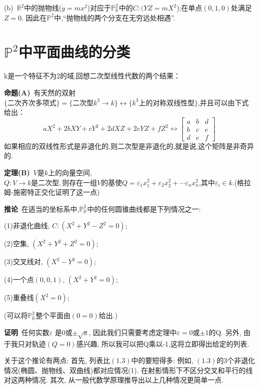 \documentclass[UTF8]{book}
\begin{document}
		
		(b)\ $\mathbb{R}^{2}$中的抛物线($y=mx^{2}$)对应于$\mathbb{P}^{2}_{\mathbb{R}}$中的$C:(YZ=mX^{2}$);在单点$ (0,1,0) $处满足$ Z=0 $. 因此在$\mathbb{P}^{2}$中,“抛物线的两个分支在无穷远处相遇”.
	
	
	\section{$\mathbb{P}^{2}$中平面曲线的分类}
		k是一个特征不为2的域,回想二次型线性代数的两个结果：
		
		
		\textbf{命题(A)}\ 有天然的双射$\{ \text{二次齐次多项式} \}=\{\text{二次型}k^{3} \to k \} \longleftrightarrow \{k^{3}\text{上的对称双线性型}\}$,并且可以由下式给出：
		\begin{equation*}
		aX^{2}+2bXY+cY^{2}+2dXZ+2eYZ+fZ^{2} \longleftrightarrow \begin{bmatrix} a & b &d \\ b & c &e\\ d & e & f\end{bmatrix}
		\end{equation*}
		如果相应的双线性形式是非退化的,则二次型是非退化的,就是说,这个矩阵是非奇异的.
		
		
		\textbf{定理(B)}\ $ V $是$ k $上的向量空间,$Q:V\to k\text{是二次型},\text{则存在一组}V\text{的基使}Q=\varepsilon_{1}x^{2}_{1}+\varepsilon_{2}x^{2}_{2}+\cdots\varepsilon_{n}x^{2}_{n}$,其中$\varepsilon_{i}\in k$.(格拉姆-施密特正交化证明了这一点)
		
		
		\textbf{推论}\ 在适当的坐标系中,$\mathbb{P}^{2}_{\mathbb{R}}$中的任何圆锥曲线都是下列情况之一:
		
			
		(1)非退化曲线, $C:(X^{2}+Y^{2}-Z^{2}=0)$;
		
		
		(2)空集, $(X^{2}+Y^{2}+Z^{2}=0)$;
		
		
		(3)交叉线对, $(X^{2}-Y^{2}=0)$;
		
		
		(4)一个点$(0,0,1)$, $(X^{2}+Y^{2}=0)$;
		
		
		(5)重叠线$(X^{2}=0)$;
		
		
		(可以将$\mathbb{P}^{2}_{\mathbb{R}}$整个平面由$ (0=0) $给出.)
		
	
		\textbf{证明}\ 任何实数$\varepsilon$ 是0或$\pm \sqrt{a}$, 因此我们只需要考虑定理中$\varepsilon=0$或$\pm1$的Q. 另外, 由于我只对轨迹$ (Q = 0) $感兴趣, 所以我可以把Q乘以-1,这将立即得出给定的列表.
		
		
		关于这个推论有两点: 首先, 列表比$ (1.3) $中的要短得多: 例如, $ (1.3) $的3个非退化情况(椭圆、抛物线、双曲线)都对应情况(1). 在射影情形下不区分交叉和平行的线对这两种情况. 其次, 从一般代数学原理推导出以上几种情况更简单一点.
\end{document}
